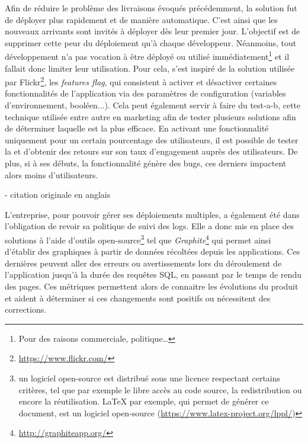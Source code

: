 Afin de réduire le problème des livraisons évoqués précédemment, la solution fut de déployer plus rapidement et de manière automatique. C'est ainsi que les nouveaux arrivants sont invités à déployer dès leur premier jour. L'objectif est de supprimer cette peur du déploiement qu'à chaque développeur. Néanmoins, tout développement n'a pas vocation à être déployé ou utilisé immédiatement\footnote{Pour des raisons commerciale, politique\ldots} et il fallait donc limiter leur utilisation. Pour cela, \etsy{} s'est inspiré de la solution utilisée par Flickr\footnote{\url{https://www.flickr.com/}}, les \emph{features flag}, qui consistent à activer et désactiver certaines fonctionnalités de l'application via des paramètres de configuration (variables d'environnement, booléen...). Cela peut également servir à faire du \gls{test-a-b}, cette technique utilisée entre autre en marketing afin de tester plusieurs solutions afin de déterminer laquelle est la plus efficace. En activant une fonctionnalité uniquement pour un certain pourcentage des utilisateurs, il est possible de tester la et d'obtenir des retours sur son taux d'engagement auprès des utilisateurs. De plus, si à ses débuts, la fonctionnalité génère des bugs, ces derniers impactent alors moins d'utilisateurs.

\epigraph{}{ \cite{etsyLogs} - citation originale en anglais}

L'entreprise, pour pouvoir gérer ses déploiements multiples, a également été dans l'obligation de revoir sa politique de suivi des logs. Elle a donc mis en place des solutions à l'aide d'outils open-source\footnote{un logiciel open-source est distribué sous une licence respectant certains critères, tel que par exemple le libre accès au code source, la redistribution ou encore la réutilisation. \LaTeX{} par exemple, qui permet de générer ce document, est un logiciel open-source (\url{https://www.latex-project.org/lppl/})} tel que \emph{Graphite}\footnote{\url{http://graphiteapp.org/}} qui permet ainsi d'établir des graphiques à partir de données récoltées depuis les applications. Ces dernières peuvent aller des erreurs ou avertissements lors du déroulement de l'application jusqu'à la durée des requêtes \gls{SQL}, en passant par le temps de rendu des pages. Ces métriques permettent alors de connaitre les évolutions du produit et aident à déterminer si ces changements sont positifs ou nécessitent des corrections.


